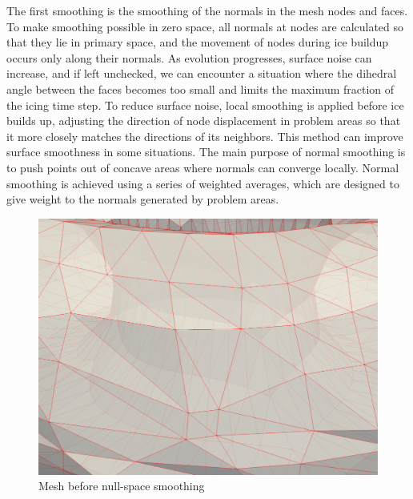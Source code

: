 The first smoothing is the smoothing of the normals in the mesh nodes and faces.
To make smoothing possible in zero space, all normals at nodes are calculated so that they lie in primary space, and the movement of nodes during ice buildup occurs only along their normals.
As evolution progresses, surface noise can increase, and if left unchecked, we can encounter a situation where the dihedral angle between the faces becomes too small and limits the maximum fraction of the icing time step.
To reduce surface noise, local smoothing is applied before ice builds up, adjusting the direction of node displacement in problem areas so that it more closely matches the directions of its neighbors.
This method can improve surface smoothness in some situations.
The main purpose of normal smoothing is to push points out of concave areas where normals can converge locally.
Normal smoothing is achieved using a series of weighted averages,
which are designed to give weight to the normals generated by
problem areas.

\begin{figure}[h]
\centering
\includegraphics[width=\textwidth]{pics/text_1_remesh_3d/pic_smooth_before.png}
\caption{Mesh before null-space smoothing}\label{fig:pic_smooth_before}
\end{figure}

